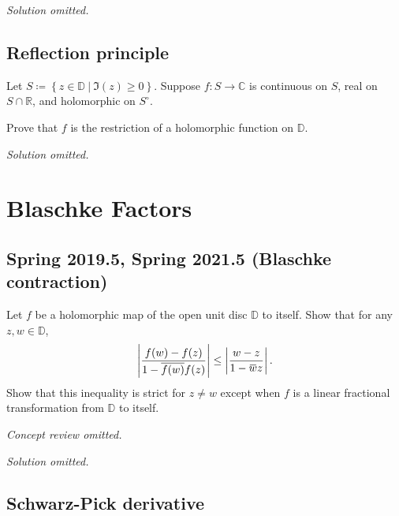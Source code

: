 \emph{Solution omitted.}

\hypertarget{reflection-principle}{%
\subsection{Reflection principle}\label{reflection-principle}}

\begin{problem}[?]

Let
\(S\coloneqq\left\{{z\in {\mathbb{D}}{~\mathrel{\Big\vert}~}\Im(z) \geq 0}\right\}\).
Suppose \(f:S\to {\mathbb{C}}\) is continuous on \(S\), real on
\(S\cap{\mathbb{R}}\), and holomorphic on \(S^\circ\).

Prove that \(f\) is the restriction of a holomorphic function on
\({\mathbb{D}}\).

\end{problem}

\emph{Solution omitted.}

\hypertarget{blaschke-factors}{%
\section{Blaschke Factors}\label{blaschke-factors}}

\hypertarget{spring-2019.5-spring-2021.5-blaschke-contraction}{%
\subsection{Spring 2019.5, Spring 2021.5 (Blaschke
contraction)}\label{spring-2019.5-spring-2021.5-blaschke-contraction}}

\begin{problem}[?]

Let \(f\) be a holomorphic map of the open unit disc \({\mathbb{D}}\) to
itself. Show that for any \(z, w\in {\mathbb{D}}\),
\begin{align*}
\left|\frac{f(w)-f(z)}{1-\overline{f(w)} f(z)}\right| \leq\left|\frac{w-z}{1-\mkern 1.5mu\overline{\mkern-1.5muw\mkern-1.5mu}\mkern 1.5mu z}\right|
.\end{align*}
Show that this inequality is strict for \(z\neq w\) except when \(f\) is
a linear fractional transformation from \({\mathbb{D}}\) to itself.

\end{problem}

\emph{Concept review omitted.}

\emph{Solution omitted.}

\hypertarget{schwarz-pick-derivative}{%
\subsection{Schwarz-Pick derivative}\label{schwarz-pick-derivative}}

